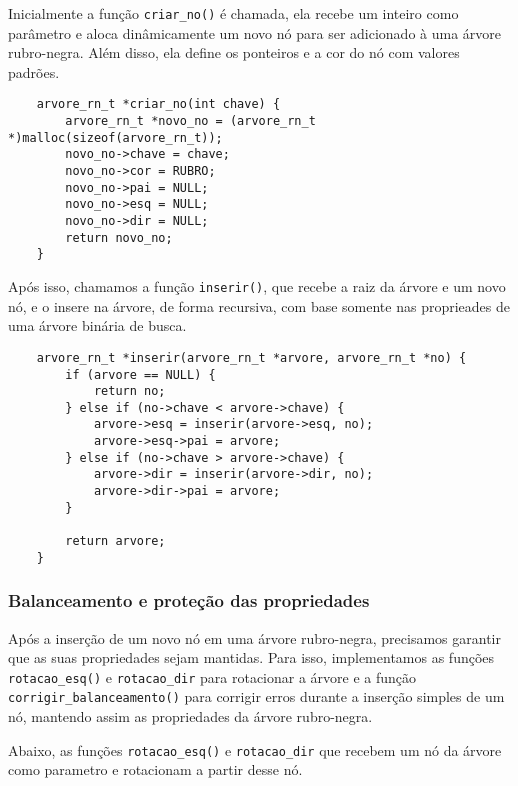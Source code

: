 Inicialmente a função \texttt{criar\_no()} é chamada, ela recebe um inteiro como parâmetro e aloca dinâmicamente um novo nó para ser adicionado à uma árvore rubro-negra. Além disso, ela define os ponteiros e a cor do nó com valores padrões.

\begin{lstlisting}
    arvore_rn_t *criar_no(int chave) {
        arvore_rn_t *novo_no = (arvore_rn_t *)malloc(sizeof(arvore_rn_t));
        novo_no->chave = chave;
        novo_no->cor = RUBRO;
        novo_no->pai = NULL;
        novo_no->esq = NULL;
        novo_no->dir = NULL;
        return novo_no;
    }
\end{lstlisting}

\vspace{3mm}

Após isso, chamamos a função \texttt{inserir()}, que recebe a raiz da árvore e um novo nó, e o insere na árvore, de forma recursiva, com base somente nas proprieades de uma árvore binária de busca.

\begin{lstlisting}
    arvore_rn_t *inserir(arvore_rn_t *arvore, arvore_rn_t *no) {
        if (arvore == NULL) {
            return no;
        } else if (no->chave < arvore->chave) {
            arvore->esq = inserir(arvore->esq, no);
            arvore->esq->pai = arvore;
        } else if (no->chave > arvore->chave) {
            arvore->dir = inserir(arvore->dir, no);
            arvore->dir->pai = arvore;
        }

        return arvore;
    }
\end{lstlisting}

\vspace{3mm}

\subsubsection{Balanceamento e proteção das propriedades}

Após a inserção de um novo nó em uma árvore rubro-negra, precisamos garantir que as suas propriedades sejam mantidas. Para isso, implementamos as funções \texttt{rotacao\_esq()} e \texttt{rotacao\_dir} para rotacionar a árvore e a função \texttt{corrigir\_balanceamento()} para corrigir erros durante a inserção simples de um nó, mantendo assim as propriedades da árvore rubro-negra.

Abaixo, as funções \texttt{rotacao\_esq()} e \texttt{rotacao\_dir} que recebem um nó da árvore como parametro e rotacionam a partir desse nó.

